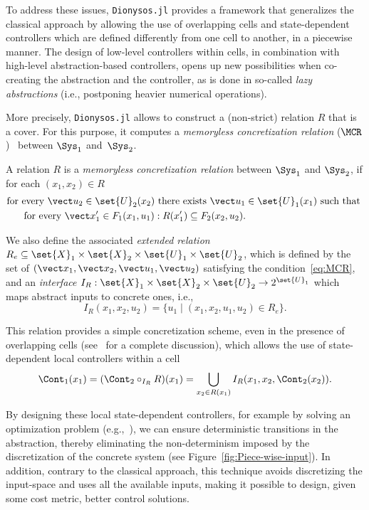 \documentclass{juliacon}
\begin{document}
To address these issues, \texttt{Dionysos.jl} provides a framework that generalizes the classical approach by allowing the use of overlapping cells and state-dependent controllers which are defined differently from one cell to another, in a piecewise manner.
The design of low-level controllers within cells, in combination with high-level abstraction-based controllers, opens up new possibilities when co-creating the abstraction and the controller, as is done in so-called \emph{lazy abstractions} (i.e., postponing heavier numerical operations).

\vskip 6pt
More precisely, \texttt{Dionysos.jl} allows to construct a (non-strict) relation $R$ that is a cover.
For this purpose, it computes a \emph{memoryless concretization relation} ($\MCR$)~\cite[Definition 8]{Calbert2024a} between $\Sys_1$ and~$\Sys_2$.
\begin{defi}
A relation $R$ is a \emph{memoryless concretization relation} between $\Sys_1$ and $\Sys_2$, if for each $(x_1,x_2)\in R$ 
\begin{align}\label{eq:MCR}
    & \text{for every } \vect u_2\in \set{U}_2(x_2) \text{ there exists } \vect u_1\in \set{U}_1(x_1) \text{ such that }\nonumber\\
    & \hspace{0.5cm}\text{ for every }\vect x_1'\in F_1(x_1,u_1): R(x_1')\subseteq F_2(x_2,u_2).
\end{align}
\end{defi}
We also define the associated \emph{extended relation} $R_e\subseteq \set{X}_1\times \set{X}_2\times \set{U}_1\times \set{U}_2$, which is defined by the set of $(\vect x_1, \vect x_2, \vect u_1, \vect u_2)$ satisfying the condition~\eqref{eq:MCR}, and an \emph{interface} $I_R:\set{X}_1\times \set{X}_2\times \set{U}_2 \rightarrow 2^{\set{U}_1}$ which maps abstract inputs to concrete ones, i.e., 
$$I_R(x_1, x_2, u_2)= \{u_1 \mid (x_1,x_2,u_1,u_2)\in R_e\}.$$

This relation provides a simple concretization scheme, even in the presence of overlapping cells (see~\cite{Calbert2024a} for a complete discussion), which allows the use of state-dependent local controllers within a cell 
$$\Cont_1(x_1) = (\Cont_2\circ_{I_R} R)(x_1) =\bigcup_{x_2\in R(x_1)} I_R(x_1,x_2,\Cont_2(x_2)).$$


By designing these local state-dependent controllers, for example by solving an optimization problem (e.g.,~\cite[Section V]{calbert2024smart}), we can ensure deterministic transitions in the abstraction, thereby eliminating the non-determinism imposed by the discretization of the concrete system (see Figure~\ref{fig:Piece-wise-input}). 
In addition, contrary to the classical approach, this technique avoids discretizing the input-space and uses all the available inputs, making it possible to design, given some cost metric, better control solutions.
\end{document}

